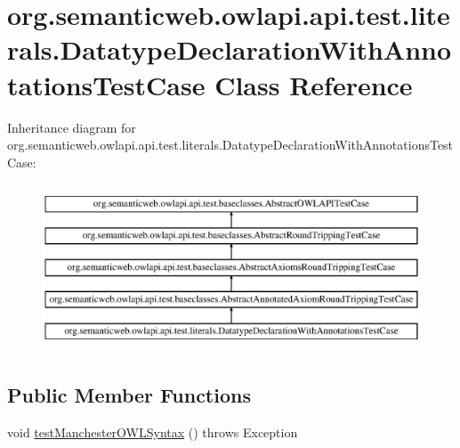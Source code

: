 \hypertarget{classorg_1_1semanticweb_1_1owlapi_1_1api_1_1test_1_1literals_1_1_datatype_declaration_with_annotations_test_case}{\section{org.\-semanticweb.\-owlapi.\-api.\-test.\-literals.\-Datatype\-Declaration\-With\-Annotations\-Test\-Case Class Reference}
\label{classorg_1_1semanticweb_1_1owlapi_1_1api_1_1test_1_1literals_1_1_datatype_declaration_with_annotations_test_case}
}
Inheritance diagram for org.\-semanticweb.\-owlapi.\-api.\-test.\-literals.\-Datatype\-Declaration\-With\-Annotations\-Test\-Case\-:\begin{figure}[H]
\begin{center}
\leavevmode
\includegraphics[height=5.000000cm]{classorg_1_1semanticweb_1_1owlapi_1_1api_1_1test_1_1literals_1_1_datatype_declaration_with_annotations_test_case}
\end{center}
\end{figure}
\subsection*{Public Member Functions}
\begin{DoxyCompactItemize}
\item 
void \hyperlink{classorg_1_1semanticweb_1_1owlapi_1_1api_1_1test_1_1literals_1_1_datatype_declaration_with_annotations_test_case_a43b499ebe61d88115d9d12eb8e0efa8c}{test\-Manchester\-O\-W\-L\-Syntax} ()  throws Exception 
\end{DoxyCompactItemize}
